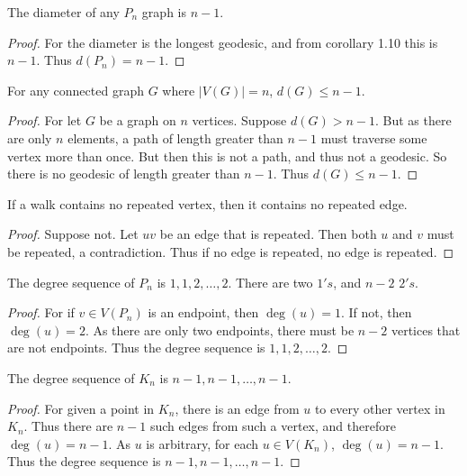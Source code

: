         \begin{theorem}
        The diameter of any $P_n$ graph is $n-1$.
        \end{theorem}
        \begin{proof}
        For the diameter is the longest geodesic, and from corollary 1.10 this is $n-1$. Thus $d(P_n) = n-1$.
        \end{proof}
        \begin{theorem}
        For any connected graph $G$ where $|V(G)| = n$, $d(G) \leq n-1$.
        \end{theorem}
        \begin{proof}
        For let $G$ be a graph on $n$ vertices. Suppose $d(G)>n-1$. But as there are only $n$ elements, a path of length greater than $n-1$ must traverse some vertex more than once. But then this is not a path, and thus not a geodesic. So there is no geodesic of length greater than $n-1$. Thus $d(G)\leq n-1$.
        \end{proof}
        \begin{theorem}
        If a walk contains no repeated vertex, then it contains no repeated edge.
        \end{theorem}
        \begin{proof}
        Suppose not. Let $uv$ be an edge that is repeated. Then both $u$ and $v$ must be repeated, a contradiction. Thus if no edge is repeated, no edge is repeated.
        \end{proof}
        \begin{theorem}
        The degree sequence of $P_n$ is $1,1,2,\hdots, 2$. There are two $1's$, and $n-2$ $2's$.
        \end{theorem}
        \begin{proof}
        For if $v\in V(P_n)$ is an endpoint, then $\deg(u) = 1$. If not, then $\deg(u) = 2$. As there are only two endpoints, there must be $n-2$ vertices that are not endpoints. Thus the degree sequence is $1,1,2,\hdots,2$.
        \end{proof}
        \begin{theorem}
        The degree sequence of $K_n$ is $n-1,n-1,\hdots, n-1$.
        \end{theorem}
        \begin{proof}
        For given a point in $K_n$, there is an edge from $u$ to every other vertex in $K_n$. Thus there are $n-1$ such edges from such 
        a vertex, and therefore $\deg(u) = n-1$. As $u$ is arbitrary, for each $u\in V(K_n)$, $\deg(u) = n-1$. Thus the degree sequence is $n-1,n-1,\hdots, n-1$.
        \end{proof}
